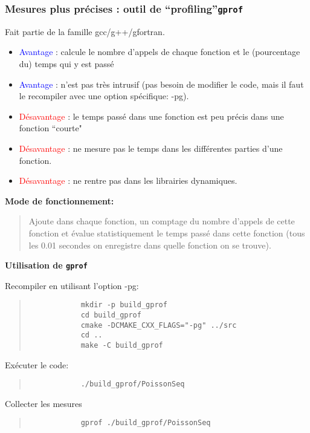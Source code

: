 \documentclass{beamer}
\begin{document}
\begin{frame}
	\frametitle{Mesures plus pr\'ecises : outil de ``profiling''{\tt gprof}}
    
	\vfill
	Fait partie de la famille gcc/g++/gfortran.
	
	
	\begin{itemize}
	\item \textcolor{blue}{Avantage} : calcule le nombre d'appels de chaque fonction et le (pourcentage du) temps qui y est pass\'e
	\item \textcolor{blue}{Avantage} : n'est pas tr\`es intrusif (pas besoin de modifier le code, mais il faut le recompiler avec une option sp\'ecifique: -pg).
	\item \textcolor{red}{D\'esavantage} : le temps pass\'e dans une fonction est peu pr\'ecis dans une fonction ``courte"
	\item \textcolor{red}{D\'esavantage} : ne mesure pas le temps dans les diff\'erentes parties d'une fonction.
	\item \textcolor{red}{D\'esavantage} : ne rentre pas dans les librairies dynamiques.
\end{itemize}
	\vfill
\end{frame}
\begin{frame}[fragile]
	
{\bf 	Mode de fonctionnement:}
	\begin{quote}
		Ajoute dans chaque fonction, un comptage du nombre d'appels de cette fonction et \'evalue statistiquement le temps pass\'e dans cette fonction (tous les 0.01 secondes on enregistre dans quelle fonction on se trouve).
	\end{quote} 

	\vfill
{\bf Utilisation de {\tt gprof}}
	\vfill

Recompiler en utilisant l'option -pg:
	\begin{quote}
		\begin{verbatim}
			mkdir -p build_gprof
			cd build_gprof
			cmake -DCMAKE_CXX_FLAGS="-pg" ../src
			cd ..
			make -C build_gprof
		\end{verbatim}
	\end{quote} 

Exécuter le code:
		\begin{quote}
		\begin{verbatim}
			./build_gprof/PoissonSeq
		\end{verbatim}
		\end{quote}
	
Collecter les mesures
		\begin{quote}
		\begin{verbatim}
			gprof ./build_gprof/PoissonSeq
		\end{verbatim}
		\end{quote}

\end{frame}
\end{document}
